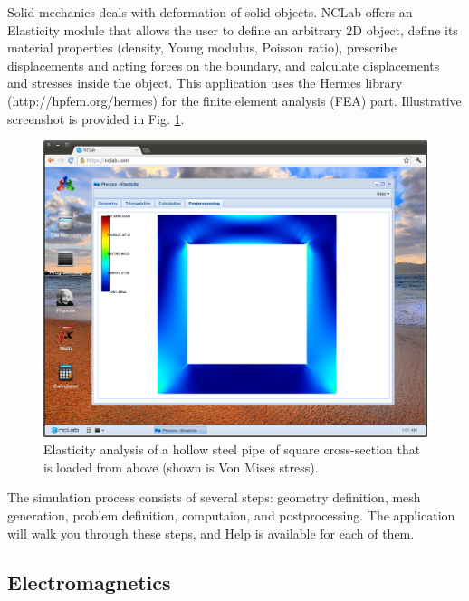 \documentclass{article}
\begin{document}
Solid mechanics deals with deformation of solid objects. NCLab 
offers an Elasticity module that allows the user to define an
arbitrary 2D object, define its material properties (density, Young modulus, 
Poisson ratio), prescribe displacements and acting forces on the boundary, 
and calculate displacements and stresses inside the object. This application  
uses the Hermes library (http://hpfem.org/hermes) for the finite element 
analysis (FEA) part. Illustrative screenshot is provided in Fig. \ref{fig:elast1}.
\begin{figure}[!ht]
\begin{center}
\includegraphics[width=\textwidth]{img/elast1.png}
\end{center}
\caption{Elasticity analysis of a hollow steel pipe of square cross-section that is loaded from above
         (shown is Von Mises stress).}
\label{fig:elast1}
\end{figure}
\noindent
The simulation process consists of several steps: geometry definition, 
mesh generation, problem definition, computaion, and postprocessing. 
The application will walk you through these steps, and Help 
is available for each of them.

\subsection{Electromagnetics}
\end{document}
